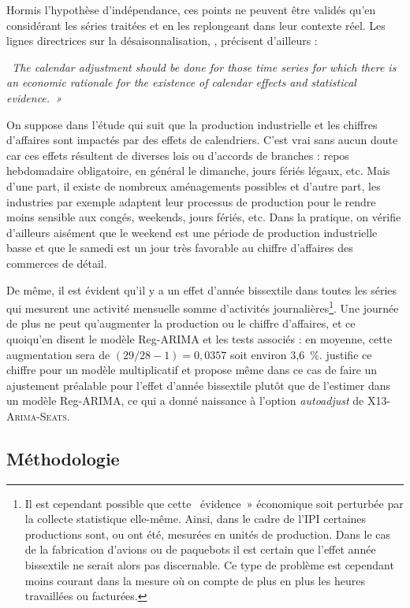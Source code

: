\documentclass[12pt, a4paper, french]{article}
\begin{document}
Hormis l'hypothèse d'indépendance, ces points ne peuvent être validés qu'en considérant les séries traitées et en les replongeant dans leur contexte réel. Les lignes directrices sur la désaisonnalisation, \cite{E2015}, précisent d'ailleurs :

{\it \og~The calendar adjustment should be done for those time series for which there is an economic rationale for the existence of calendar effects and statistical evidence.~»}

On suppose dans l'étude qui suit que la production industrielle et les chiffres d'affaires sont impactés par des effets de calendriers. C’est vrai sans aucun doute car ces effets résultent de diverses lois ou d'accords de branches : repos hebdomadaire obligatoire, en général le dimanche, jours fériés légaux, etc. Mais d'une part, il existe de nombreux aménagements possibles et d'autre part, les industries par exemple adaptent leur processus de production pour le rendre moins sensible aux congés, weekends, jours fériés, etc. Dans la pratique, on vérifie d'ailleurs aisément que le weekend est une période de production industrielle basse et que le samedi est un jour très favorable au chiffre d'affaires des commerces de détail.

De même, il est évident qu'il y a un effet d'année bissextile dans toutes les séries qui mesurent une activité mensuelle somme d'activités journalières\footnote{Il est cependant possible que cette \og~évidence~» économique soit perturbée par la collecte statistique elle-même. Ainsi, dans le cadre de l'IPI certaines productions sont, ou ont été, mesurées en unités de production. Dans le cas de la fabrication d'avions ou de paquebots il est certain que l'effet année bissextile ne serait alors pas discernable. Ce type de problème est cependant moins courant dans la mesure où on compte de plus en plus les heures travaillées ou facturées.}. Une journée de plus ne peut qu'augmenter la production ou le chiffre d'affaires, et ce quoiqu'en disent le modèle Reg-ARIMA et les tests associés : en moyenne, cette augmentation sera de $(29/28 - 1) = 0,0357$ soit environ 3,6~\%. \cite{B1992} justifie ce chiffre pour un modèle multiplicatif et propose même dans ce cas de faire un ajustement préalable pour l'effet d'année bissextile plutôt que de l'estimer dans un modèle Reg-ARIMA, ce qui a donné naissance à l'option \emph{autoadjust} de \textsc{X13-Arima-Seats}.

\subsection{Méthodologie}
\end{document}
